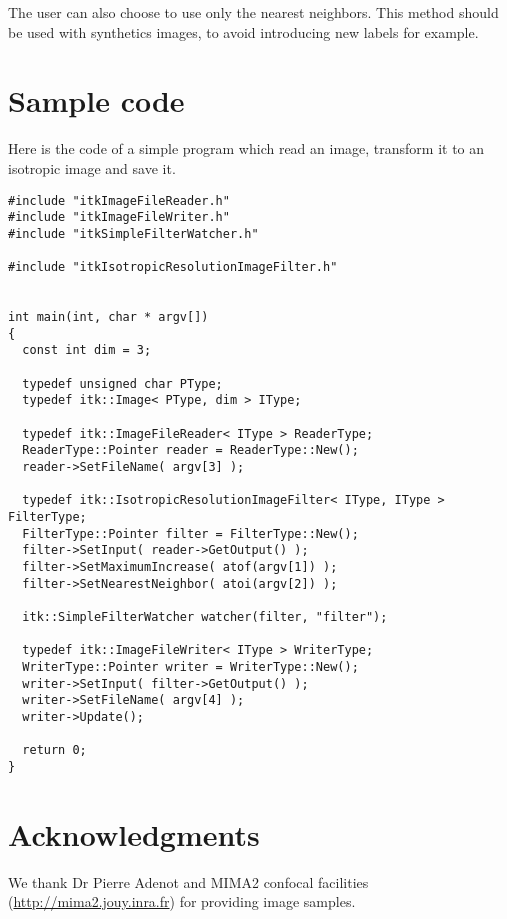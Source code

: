 \documentclass{InsightArticle}
\begin{document}
The user can also choose to use only the nearest neighbors. This method should be used with synthetics images, to avoid introducing new labels for example.

\section{Sample code}
Here is the code of a simple program which read an image, transform it to an isotropic image and save it.

\small \begin{verbatim}
#include "itkImageFileReader.h"
#include "itkImageFileWriter.h"
#include "itkSimpleFilterWatcher.h"

#include "itkIsotropicResolutionImageFilter.h"


int main(int, char * argv[])
{
  const int dim = 3;
  
  typedef unsigned char PType;
  typedef itk::Image< PType, dim > IType;

  typedef itk::ImageFileReader< IType > ReaderType;
  ReaderType::Pointer reader = ReaderType::New();
  reader->SetFileName( argv[3] );

  typedef itk::IsotropicResolutionImageFilter< IType, IType > FilterType;
  FilterType::Pointer filter = FilterType::New();
  filter->SetInput( reader->GetOutput() );
  filter->SetMaximumIncrease( atof(argv[1]) );
  filter->SetNearestNeighbor( atoi(argv[2]) );

  itk::SimpleFilterWatcher watcher(filter, "filter");

  typedef itk::ImageFileWriter< IType > WriterType;
  WriterType::Pointer writer = WriterType::New();
  writer->SetInput( filter->GetOutput() );
  writer->SetFileName( argv[4] );
  writer->Update();

  return 0;
}
\end{verbatim} \normalsize


\section{Acknowledgments}
We thank Dr Pierre Adenot and MIMA2 confocal facilities
(\url{http://mima2.jouy.inra.fr})
for providing image samples.


\appendix





\nocite{ITKSoftwareGuide}
\end{document}
